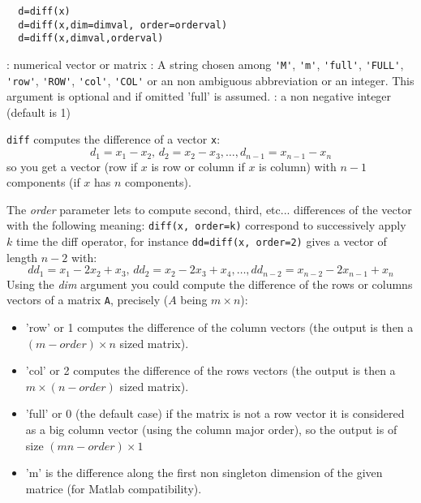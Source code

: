 \begin{mandesc}
\end{mandesc}
\begin{calling_sequence}
\begin{verbatim}
  d=diff(x)  
  d=diff(x,dim=dimval, order=orderval)  
  d=diff(x,dimval,orderval)
\end{verbatim}
\end{calling_sequence}
\begin{parameters}
  \begin{varlist}
    : numerical vector or matrix
    : A string chosen among \verb+'M'+, \verb+'m'+, \verb+'full'+, \verb+'FULL'+, \verb+'row'+,
    \verb+'ROW'+, \verb+'col'+, \verb+'COL'+ or an non ambiguous abbreviation or an integer. 
    This argument is optional and if omitted 'full' is assumed.
    : a non negative integer (default is 1)   
  \end{varlist}
\end{parameters}
\begin{mandescription}
  \verb+diff+ computes the difference of a vector \verb+x+:
$$
d_1 = x_1 - x_2, \, d_2 = x_2 - x_3, \dots, d_{n-1} = x_{n-1} - x_n
$$
 so you get a vector (row if $x$ is row or column if $x$ is column) with 
 $n-1$ components (if $x$ has $n$ components).

 The {\em order} parameter lets to compute second, third, etc... differences of the vector
 with the following meaning: \verb+diff(x, order=k)+ correspond to successively apply 
 $k$ time the diff operator, for instance  \verb+dd=diff(x, order=2)+ gives a vector of
 length $n-2$ with:
$$
dd_1 = x_1 - 2x_2 + x_3, \, dd_2 = x_2 - 2x_3 + x_4, \dots, dd_{n-2} = x_{n-2} - 2x_{n-1} + x_n
$$
Using the {\em dim} argument you could compute the difference of the rows or columns vectors
of a matrix \verb+A+, precisely ($A$ being $m \times n$):
  \begin{itemize}
    \item 'row' or 1  computes the difference of the column vectors (the output is then a $(m-order) \times n$
          sized matrix).
    \item 'col' or 2  computes the difference of the rows vectors (the output is then a $m \times (n-order)$
          sized matrix).
    \item 'full' or 0 (the default case) if the matrix is not a row vector it is considered as 
           a big column vector (using the column major order), so the output is of size $(mn - order) \times 1$
    \item 'm' is the difference along the first non singleton dimension of the given matrice 
          (for Matlab compatibility). 
  \end{itemize}
\end{mandescription}


